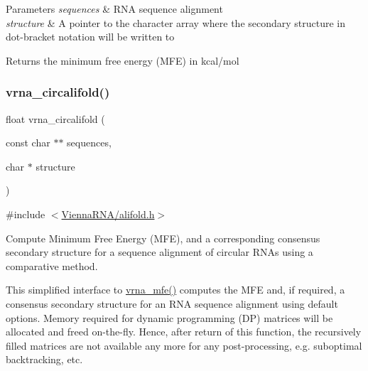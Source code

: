 \begin{DoxyParams}{Parameters}
{\em sequences} & R\+NA sequence alignment \\
\hline
{\em structure} & A pointer to the character array where the secondary structure in dot-\/bracket notation will be written to \\
\hline
\end{DoxyParams}
\begin{DoxyReturn}{Returns}
the minimum free energy (M\+FE) in kcal/mol 
\end{DoxyReturn}
\mbox{\label{group__consensus__mfe__fold_ga17a1be7490468c29c335ba9bffacba53}} 
\subsubsection{\texorpdfstring{vrna\+\_\+circalifold()}{vrna\_circalifold()}}
{\footnotesize\ttfamily float vrna\+\_\+circalifold (\begin{DoxyParamCaption}\item[{const char $\ast$$\ast$}]{sequences,  }\item[{char $\ast$}]{structure }\end{DoxyParamCaption})}



{\ttfamily \#include $<$\hyperlink{alifold_8h}{Vienna\+R\+N\+A/alifold.\+h}$>$}



Compute Minimum Free Energy (M\+FE), and a corresponding consensus secondary structure for a sequence alignment of circular R\+N\+As using a comparative method. 

This simplified interface to \hyperlink{group__mfe__fold_gabd3b147371ccf25c577f88bbbaf159fd}{vrna\+\_\+mfe()} computes the M\+FE and, if required, a consensus secondary structure for an R\+NA sequence alignment using default options. Memory required for dynamic programming (DP) matrices will be allocated and free\textquotesingle{}d on-\/the-\/fly. Hence, after return of this function, the recursively filled matrices are not available any more for any post-\/processing, e.\+g. suboptimal backtracking, etc.

